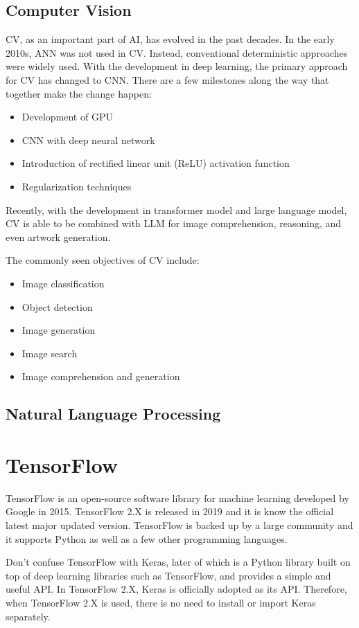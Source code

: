 \subsection{Computer Vision}

CV, as an important part of AI, has evolved in the past decades. In the early 2010s, ANN was not used in CV. Instead, conventional deterministic approaches were widely used. With the development in deep learning, the primary approach for CV has changed to CNN. There are a few milestones along the way that together make the change happen:
\begin{itemize}
  \item Development of GPU
  \item CNN with deep neural network
  \item Introduction of rectified linear unit (ReLU) activation function
  \item Regularization techniques
\end{itemize}
Recently, with the development in transformer model and large language model, CV is able to be combined with LLM for image comprehension, reasoning, and even artwork generation.

The commonly seen objectives of CV include:
\begin{itemize}
  \item Image classification
  \item Object detection
  \item Image generation
  \item Image search
  \item Image comprehension and generation
\end{itemize}

\subsection{Natural Language Processing}

\section{TensorFlow}

TensorFlow is an open-source software library for machine learning developed by Google in 2015. TensorFlow 2.X is released in 2019 and it is know the official latest major updated version. TensorFlow is backed up by a large community and it supports Python as well as a few other programming languages.

Don't confuse TensorFlow with Keras, later of which is a Python library built on top of deep learning libraries such as TensorFlow, and provides a simple and useful API. In TensorFlow 2.X, Keras is officially adopted as its API. Therefore, when TensorFlow 2.X is used, there is no need to install or import Keras separately.

